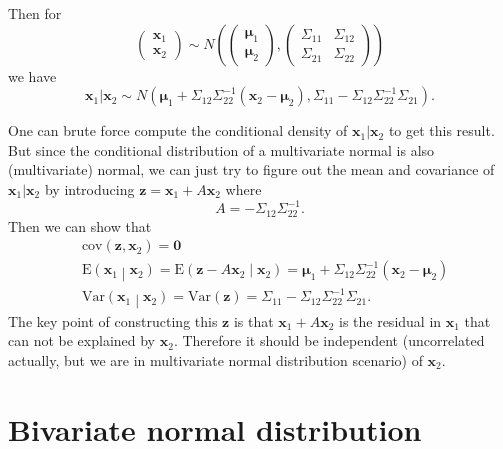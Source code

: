 \documentclass[a4paper,12pt]{article}
\begin{document}
Then for
\[
  \begin{pmatrix}
    \bm{x}_1    \\
    \bm{x}_2
  \end{pmatrix}
  \sim N\left(
    \begin{pmatrix}
      \bm{\mu}_1    \\
      \bm{\mu}_2
    \end{pmatrix},
    \begin{pmatrix}
      \Sigma_{11} & \Sigma_{12}    \\
      \Sigma_{21} & \Sigma_{22}
    \end{pmatrix}
  \right)
\]
we have
\[
  \bm{x}_1|\bm{x}_2
  \sim N\left(
    \bm{\mu}_1 + \Sigma_{12}\Sigma_{22}^{-1}\left(\bm{x}_2 - \bm{\mu}_2\right),
    \Sigma_{11} - \Sigma_{12}\Sigma_{22}^{-1}\Sigma_{21}
  \right)
  .
\]

One can brute force compute the conditional density of $\bm{x}_1|\bm{x}_2$ to get this result. But since the conditional distribution of a multivariate normal is also (multivariate) normal, we can just try to figure out the mean and covariance of $\bm{x}_1|\bm{x}_2$ by introducing $\bm{z} = \bm{x}_1 + A\bm{x}_2$ where
\[
  A = -\Sigma_{12}\Sigma_{22}^{-1}
  .
\]
Then we can show that
\[
  \begin{aligned}
    & \mathrm{cov}\left(\bm{z}, \bm{x}_2\right) = \bm{0}    \\
    & \mathrm{E}\left(\bm{x}_1\middle|\bm{x}_2\right)
    = \mathrm{E}\left(\bm{z} - A\bm{x}_2\middle|\bm{x}_2\right)
    = \bm{\mu}_1 + \Sigma_{12}\Sigma_{22}^{-1}\left(\bm{x}_2 - \bm{\mu}_2\right)    \\
    & \mathrm{Var}\left(\bm{x}_1\middle| \bm{x}_2\right) = \mathrm{Var}\left(\bm{z}\right) = \Sigma_{11} - \Sigma_{12}\Sigma_{22}^{-1}\Sigma_{21}
    .
  \end{aligned}
\]
The key point of constructing this $\bm{z}$ is that $\bm{x}_1 + A\bm{x}_2$ is the residual in $\bm{x}_1$ that can not be explained by $\bm{x}_2$. Therefore it should be independent (uncorrelated actually, but we are in multivariate normal distribution scenario) of $\bm{x}_2$.

\section{Bivariate normal distribution}
\label{sec:bivar-norm-distr}
\end{document}

